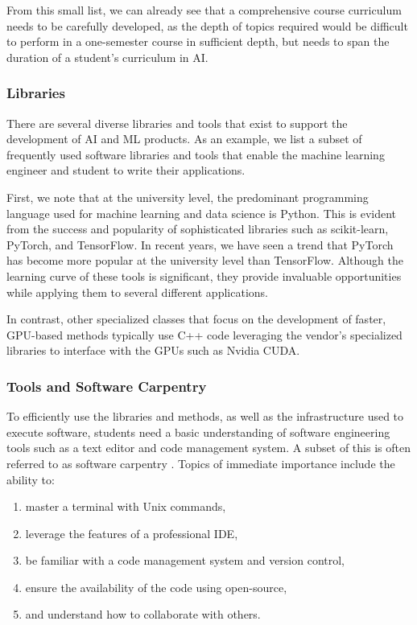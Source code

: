 \documentclass[utf8]{FrontiersinVancouver} %
\begin{document}
From this small list, we can already see that a comprehensive course curriculum needs to be carefully developed, as the depth of topics required would be difficult to perform in a one-semester course in sufficient depth, but needs to span the duration of a student's curriculum in AI.

\subsubsection{Libraries}

There are several diverse libraries and tools that exist to support the development of AI and ML products. As an example, we list a subset of frequently used software libraries and tools that enable the machine learning engineer and student to write their applications.

First, we note that at the university level, the predominant programming language used for machine learning and data science is Python. This is evident from the success and popularity of sophisticated libraries such as scikit-learn, PyTorch, and TensorFlow. In recent years, we have seen a trend that PyTorch has become more popular at the university level than TensorFlow. Although the learning curve of these tools is significant, they provide invaluable opportunities while applying them to several different applications.

In contrast, other specialized classes that focus on the development of faster, GPU-based methods typically use C++ code leveraging the vendor's specialized libraries to interface with the GPUs such as Nvidia CUDA.

\subsubsection{Tools and Software Carpentry}\label{sec:tools}


To efficiently use the libraries and methods, as well as the infrastructure used to execute software, students need a basic understanding of software engineering tools such as a text editor and code management system. A subset of this is often referred to as software carpentry \cite{software-carpentry}. Topics of immediate importance include the ability to:

\begin{enumerate}
    \item master a terminal with Unix commands,
    \item leverage the features of a professional IDE,
    \item be familiar with a code management system and version control,
    \item ensure the availability of the code using open-source,
    \item and understand how to collaborate with others.
\end{enumerate}
\end{document}
